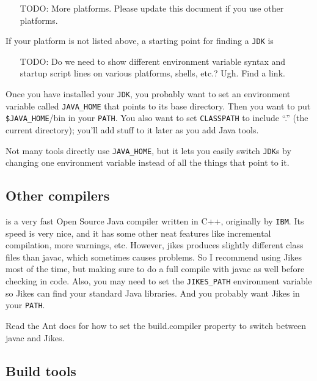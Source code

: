 \documentclass{article}
\begin{document}
\begin{itemize}
\item[TODO:] More platforms. Please update this document if you use
other platforms.
\end{itemize}

If your platform is not listed above, a starting point for finding a
\texttt{JDK} is 

\begin{itemize}
\item[TODO:] Do we need to show different environment variable syntax and
startup script lines on various platforms, shells, etc.? Ugh. Find a link.
\end{itemize}

Once you have installed your \texttt{JDK}, you probably want to set an
environment variable called \texttt{JAVA\_HOME} that points to its base
directory. Then you want to put \texttt{\$JAVA\_HOME}/bin in your
\texttt{PATH}. You also want to set \texttt{CLASSPATH} to include ``.''
(the current directory); you'll add stuff to it later as you add Java tools.

Not many tools directly use \texttt{JAVA\_HOME}, but it lets you easily
switch \texttt{JDK}s by changing one environment variable instead of all
the things that point to it.

\subsection{Other compilers}

 is a very fast Open Source Java compiler
written in C++, originally by \texttt{IBM}. Its speed is very nice, and it has some other neat 
features like incremental compilation, more warnings, etc. However, 
jikes produces slightly different class files than javac, which 
sometimes causes problems. So I recommend using Jikes most of the time,
but making sure to do a full compile with javac as well before checking
in code.
Also, you may need to set the \texttt{JIKES\_PATH} environment variable so
Jikes can find your standard Java libraries. And you probably want Jikes in
your \texttt{PATH}.

Read the Ant docs for how to set the build.compiler property to 
switch between javac and Jikes.

\subsection{Build tools}
\end{document}
